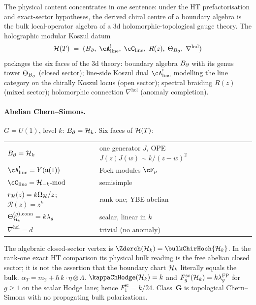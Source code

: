 \noindent
The physical content concentrates in one sentence: under the HT
prefactorisation and exact-sector hypotheses, the derived chiral
centre of a boundary algebra is the bulk local-operator algebra of
a 3d holomorphic-topological gauge theory. The holographic modular
Koszul datum
\[
\mathcal{H}(T)
\;=\;
(\Bbound,\; \cA^!_{\mathrm{line}},\; \cC_{\mathrm{line}},\;
R(z),\; \Theta_{\Bbound},\; \nabla^{\mathrm{hol}})
\]
packages the six faces of the 3d theory: boundary
algebra $B_{\partial}$ with its genus tower $\Theta_{B_{\partial}}$
(closed sector); line-side Koszul dual $\cA^!_{\mathrm{line}}$
modelling the line category on the chirally Koszul locus (open
sector); spectral braiding $R(z)$ (mixed sector); holomorphic
connection $\nabla^{\mathrm{hol}}$ (anomaly completion).

\paragraph{Abelian Chern--Simons.}
$G = U(1)$, level $k$: $B_{\partial} = \mathcal{H}_k$. Six faces of $\mathcal{H}(T)$:
\begin{center}
\small
\renewcommand{\arraystretch}{1.15}
\begin{tabular}{ll}
$B_{\partial} = \mathcal{H}_k$ & one generator $J$, OPE $J(z)J(w) \sim k/(z-w)^2$ \\
$\cA^!_{\mathrm{line}} = Y(\mathfrak{u}(1))$ & Fock modules $\cF_\mu$ \\
$\cC_{\mathrm{line}} = \cH_{-k}\text{-mod}$ & semisimple \\
$r_{\mathcal{H}}(z)=k\Omega_{\mathcal{H}}/z$; $\mathcal R(z)=z^k$ & rank-one; YBE abelian \\
$\Theta_{\mathcal{H}_k}^{(g),\mathrm{conn}} = k\lambda_g$ & scalar, linear in $k$ \\
$\nabla^{\mathrm{hol}} = d$ & trivial (no anomaly)
\end{tabular}
\end{center}
The algebraic closed-sector vertex is
\(\Zderch(\cH_k)=\bulkChirHoch{\cH_k}\).  In the rank-one exact
HT comparison its physical bulk reading is the free abelian closed
sector; it is not the assertion that the boundary chart \(\mathcal{H}_k\)
literally equals the bulk.
$\alpha_T = m_2 + \hbar\,k\cdot\eta\otimes\Lambda$.
$\kappaChHodge(\cH_k) = k$ and
\(F_g^{\mathrm{sc}}(\mathcal{H}_k)=k\lambda_g^{\mathrm{FP}}\) for
\(g\ge 1\) on the scalar Hodge lane; hence
\(F_1^{\mathrm{sc}} = k/24\). Class~$\mathbf{G}$ is topological
Chern--Simons with no propagating bulk polarizations.

